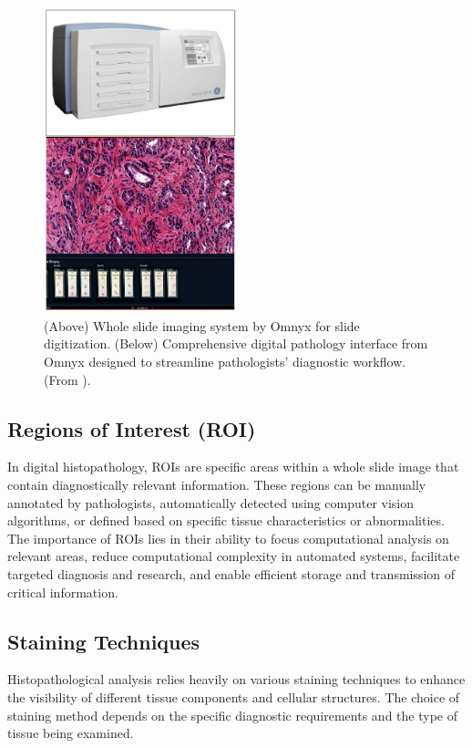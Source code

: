 \begin{figure}[h]
  \centering
  \includegraphics[width=0.5\textwidth]{Cap2/Figures/hist_scanner.jpg}
  \caption{(Above) Whole slide imaging system by Omnyx for slide
    digitization. (Below) Comprehensive digital pathology interface
    from Omnyx designed to streamline pathologists' diagnostic
  workflow. (From \cite{FarahaniEtAl2015}).}
  \label{fig:wsi}
\end{figure}

\subsection{Regions of Interest (ROI)}

In digital histopathology, \glspl{ROI} are specific areas within a
whole slide image that contain diagnostically relevant information.
These regions can be manually annotated by pathologists,
automatically detected using computer vision algorithms, or defined
based on specific tissue characteristics or abnormalities. The
importance of \glspl{ROI} lies in their ability to focus
computational analysis on relevant areas, reduce computational
complexity in automated systems, facilitate targeted diagnosis and
research, and enable efficient storage and transmission of critical information.

\subsection{Staining Techniques}

Histopathological analysis relies heavily on various staining
techniques to enhance the visibility of different tissue components
and cellular structures. The choice of staining method depends on the
specific diagnostic requirements and the type of tissue being examined.


